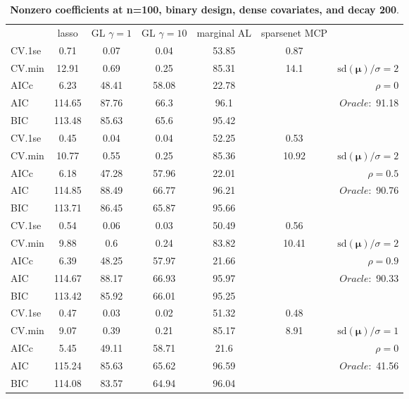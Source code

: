\clearpage
\begin{table}\vspace{-.5cm}
\caption[l]{ { \bf Nonzero coefficients at n=100, binary design, 
dense covariates, and  decay  200}.}
\vspace{-.5cm}
\footnotesize{}
\begin{center}
\begin{tabular}{l*{5}{c}|r}
& lasso & GL $\gamma=1$ & GL $\gamma=10$ & marginal AL & sparsenet MCP  & \\
 \cline{1-7}
CV.1se & 0.71 & 0.07 & 0.04 & 53.85 & 0.87 & \\
CV.min & 12.91 & 0.69 & 0.25 & 85.31 & 14.1 &  $\mathrm{sd}(\mathbf{\mu})/\sigma=2$ \\
AICc & 6.23 & 48.41 & 58.08 & 22.78 & & $\rho=0$ \\
AIC & 114.65 & 87.76 & 66.3 & 96.1 & &  \multirow{2}{*}{$Oracle: $ 91.18} \\
BIC & 113.48 & 85.63 & 65.6 & 95.42 & &  \\
 \hline 
CV.1se & 0.45 & 0.04 & 0.04 & 52.25 & 0.53 & \\
CV.min & 10.77 & 0.55 & 0.25 & 85.36 & 10.92 &  $\mathrm{sd}(\mathbf{\mu})/\sigma=2$ \\
AICc & 6.18 & 47.28 & 57.96 & 22.01 & & $\rho=0.5$ \\
AIC & 114.85 & 88.49 & 66.77 & 96.21 & &  \multirow{2}{*}{$Oracle: $ 90.76} \\
BIC & 113.71 & 86.45 & 65.87 & 95.66 & &  \\
 \hline 
CV.1se & 0.54 & 0.06 & 0.03 & 50.49 & 0.56 & \\
CV.min & 9.88 & 0.6 & 0.24 & 83.82 & 10.41 &  $\mathrm{sd}(\mathbf{\mu})/\sigma=2$ \\
AICc & 6.39 & 48.25 & 57.97 & 21.66 & & $\rho=0.9$ \\
AIC & 114.67 & 88.17 & 66.93 & 95.97 & &  \multirow{2}{*}{$Oracle: $ 90.33} \\
BIC & 113.42 & 85.92 & 66.01 & 95.25 & &  \\
 \hline 
CV.1se & 0.47 & 0.03 & 0.02 & 51.32 & 0.48 & \\
CV.min & 9.07 & 0.39 & 0.21 & 85.17 & 8.91 &  $\mathrm{sd}(\mathbf{\mu})/\sigma=1$ \\
AICc & 5.45 & 49.11 & 58.71 & 21.6 & & $\rho=0$ \\
AIC & 115.24 & 85.63 & 65.62 & 96.59 & &  \multirow{2}{*}{$Oracle: $ 41.56} \\
BIC & 114.08 & 83.57 & 64.94 & 96.04 & &  \\

\end{tabular}
\end{center}
\end{table}
